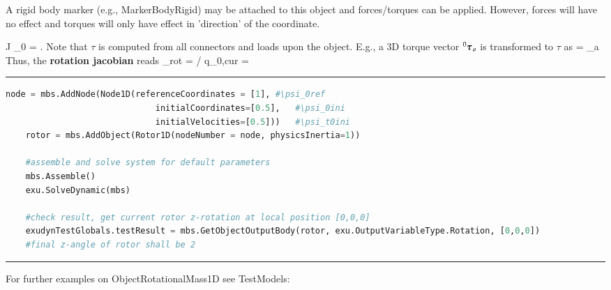     \finishTable
    A rigid body marker (e.g., MarkerBodyRigid) may be attached to this object and forces/torques can be applied. 
    However, forces will have no effect and torques will only have effect in 'direction' of the coordinate.

    \be 
      J \cdot \ddot \psi_0 = \tau.
    \ee
    Note that $\tau$ is computed from all connectors and loads upon the object. E.g., a 3D torque vector $\prescript{0}{}{\mbox{\boldmath $\tau$ \unboldmath}\!\!}\,_a$ is 
    transformed to $\tau$ as
    \be
      \tau =  _a
    \ee
    Thus, the {\bf rotation jacobian} reads 
    \be
      \Jm_{rot} = \partial \tomega\cCur / \partial \dot q_{0,cur} = 
        
    \ee
\vspace{6pt}\par\noindent\rule{\textwidth}{0.4pt}
\label{miniExample_ObjectRotationalMass1D}
\pythonstyle
\begin{lstlisting}[language=Python, firstnumber=1]
    node = mbs.AddNode(Node1D(referenceCoordinates = [1], #\psi_0ref
                              initialCoordinates=[0.5],   #\psi_0ini
                              initialVelocities=[0.5]))   #\psi_t0ini
    rotor = mbs.AddObject(Rotor1D(nodeNumber = node, physicsInertia=1))

    #assemble and solve system for default parameters
    mbs.Assemble()
    exu.SolveDynamic(mbs)

    #check result, get current rotor z-rotation at local position [0,0,0]
    exudynTestGlobals.testResult = mbs.GetObjectOutputBody(rotor, exu.OutputVariableType.Rotation, [0,0,0])
    #final z-angle of rotor shall be 2

\end{lstlisting}

\vspace{6pt}\par\noindent\rule{\textwidth}{0.4pt}
%
\noindent For further examples on ObjectRotationalMass1D see TestModels:
\bi
\item{}\ei

